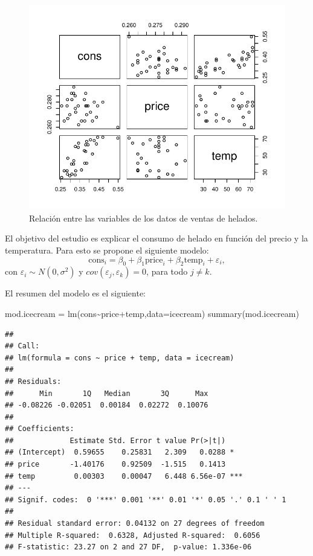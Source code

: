 \documentclass[
]{article}
\newenvironment{Shaded}{\begin{snugshade}}{\end{snugshade}}
\newcommand{\AttributeTok}[1]{\textcolor[rgb]{0.77,0.63,0.00}{#1}}
\newcommand{\FunctionTok}[1]{\textcolor[rgb]{0.00,0.00,0.00}{#1}}
\newcommand{\NormalTok}[1]{#1}
\newcommand{\OtherTok}[1]{\textcolor[rgb]{0.56,0.35,0.01}{#1}}
\newcommand{\SpecialCharTok}[1]{\textcolor[rgb]{0.00,0.00,0.00}{#1}}
\begin{document}
\begin{figure}

{\centering \includegraphics{MLGI_files/figure-latex/Icecream-1} 

}

\caption{\label{fig:icecream} Relación entre las variables de los datos de ventas de helados.}\label{fig:Icecream}
\end{figure}

El objetivo del estudio es explicar el consumo de helado en función del precio y la temperatura. Para esto se propone el siguiente modelo:
\[
\mbox{cons}_{i} = \beta_{0} + \beta_{1}\mbox{price}_{i} + \beta_{2}\mbox{temp}_{i} + \varepsilon_{i},
\]
con \(\varepsilon_{i} \sim N\left(0,\sigma^{2} \right)\) y \(cov(\varepsilon_{j},\varepsilon_{k})=0\), para todo \(j \neq k\).

El resumen del modelo es el siguiente:

\begin{Shaded}
\begin{Highlighting}[]
\NormalTok{  mod.icecream }\OtherTok{=} \FunctionTok{lm}\NormalTok{(cons}\SpecialCharTok{\textasciitilde{}}\NormalTok{price}\SpecialCharTok{+}\NormalTok{temp,}\AttributeTok{data=}\NormalTok{icecream)}
\FunctionTok{summary}\NormalTok{(mod.icecream)}
\end{Highlighting}
\end{Shaded}

\begin{verbatim}
## 
## Call:
## lm(formula = cons ~ price + temp, data = icecream)
## 
## Residuals:
##      Min       1Q   Median       3Q      Max 
## -0.08226 -0.02051  0.00184  0.02272  0.10076 
## 
## Coefficients:
##             Estimate Std. Error t value Pr(>|t|)    
## (Intercept)  0.59655    0.25831   2.309   0.0288 *  
## price       -1.40176    0.92509  -1.515   0.1413    
## temp         0.00303    0.00047   6.448 6.56e-07 ***
## ---
## Signif. codes:  0 '***' 0.001 '**' 0.01 '*' 0.05 '.' 0.1 ' ' 1
## 
## Residual standard error: 0.04132 on 27 degrees of freedom
## Multiple R-squared:  0.6328, Adjusted R-squared:  0.6056 
## F-statistic: 23.27 on 2 and 27 DF,  p-value: 1.336e-06
\end{verbatim}
\end{document}
